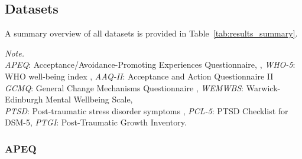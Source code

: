 \documentclass[man,floatsintext]{apa7}
\newcommand{\change}[1]{#1}
\begin{document}
\subsection{Datasets}

A summary overview of all datasets is provided in Table~\ref{tab:results_summary}.


\begin{table}[!htbp]
\small\renewcommand{\arraystretch}{0.9}%

    \caption{Overview of the datasets and main results for all outcome variables considered here. \change{$R^2$ values are cross-validated (held-out) $R^2$ from the repeated nested cross-validation, with \res{set.nprin} PCA components per free-text response. The baseline + text model contains all free-text responses of the dataset (the pre-specified test); $\Delta R^2$ is tested with the corrected repeated $k$-fold $t$-test.}}

    \centering
    \begin{threeparttable}

    

\begin{tablenotes}[flushleft]
\small
\item \change{\textit{Note.}\\ \textit{APEQ}: Acceptance/Avoidance-Promoting Experiences Questionnaire, \cite{wolff2022acceptance}, \textit{WHO-5}: WHO well-being index , \textit{AAQ-II}: Acceptance and Action
Questionnaire II\\ \textit{GCMQ}: General Change Mechanisms Questionnaire \cite{wolff2024measuring}, \textit{WEMWBS}: Warwick-Edinburgh Mental Wellbeing Scale, \\ \textit{PTSD}: Post-traumatic stress disorder symptoms \cite{evens2026post}, \textit{PCL-5}: PTSD Checklist for DSM-5, \textit{PTGI}:  Post-Traumatic Growth Inventory.}
\end{tablenotes}


\end{threeparttable}
    \label{tab:results_summary}
\end{table}


\subsubsection{APEQ}
\end{document}
